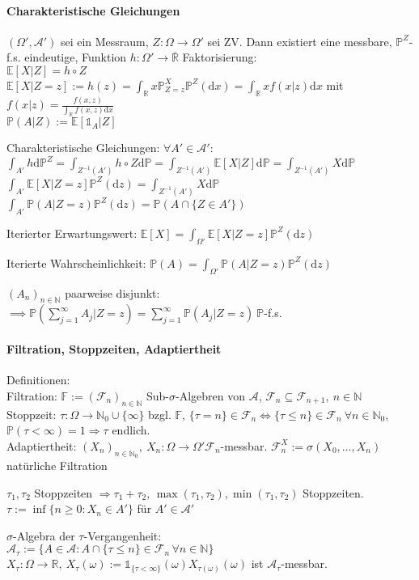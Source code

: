 \documentclass[a4paper,draft]{article}
\newcommand{\R}{\mathds{R}}
\newcommand{\N}{\mathds{N}}
\newcommand{\one}{\mathds{1}}
\newcommand{\A}{\mathcal{A}}
\renewcommand{\P}{\mathds{P}}
\newcommand{\E}[1]{\mathds{E}[#1]}
\newcommand{\F}{\mathcal{F}}
\newcommand{\cE}[2]{\E{#1 | #2}}
\renewcommand{\d}{\mathrm{d}}
\newcommand{\parh}{\par\hangindent=0.5cm}
\begin{document}
\begin{multicols}{2}
\paragraph{Charakteristische Gleichungen}\hspace{0pt}\parh
$(\Omega',\A')$ sei ein Messraum, $Z:\Omega\to\Omega'$ sei ZV. Dann existiert eine messbare, $\P^Z$-f.s. eindeutige, Funktion $h:\Omega'\to\overline{\R}$ Faktorisierung:\\
$\cE{X}{Z}=h\circ Z$\\
$\cE{X}{Z=z}:=h(z)=\int_\R x\P_{Z=z}^X \P^Z(\d x)=\int_\R xf(x|z)\d x$ mit $f(x|z)=\frac{f(x,z)}{\int_\R f(x,z)\d x}$\\
$\P(A|Z):=\cE{\one_A}{Z}$\parh
Charakteristische Gleichungen: $\forall A'\in\A'$:\\
$\int_{A'}h\d \P^Z=\int_{Z^{-1}(A')}h\circ Z \d\P=\int_{Z^{-1}(A')}\cE{X}{Z}\d\P=\int_{Z^{-1}(A')}X\d\P$\\
$\int_{A'}\cE{X}{Z=z}\P^Z(\d z)=\int_{Z^{-1}(A')}X\d\P$\\
$\int_{A'} \P(A|Z=z)\P^Z(\d z) =\P(A\cap\{Z\in A'\})$\parh
Iterierter Erwartungswert: $\E{X}=\int_{\Omega'}\cE{X}{Z=z}\P^Z(\d z)$\parh
Iterierte Wahrscheinlichkeit: $\P(A)=\int_{\Omega'}\P(A|Z=z)\P^Z(\d z)$\parh
$(A_n)_{n\in\N}$ paarweise disjunkt:\\
$\implies \P\left(\sum_{j=1}^\infty A_j\big|Z=z\right)=\sum_{j=1}^\infty \P(A_j|Z=z) \: \P$-f.s.

\paragraph{Filtration, Stoppzeiten, Adaptiertheit}\hspace{0pt}\parh
Definitionen:\\
Filtration: $\mathds{F}:=(\F_n)_{n\in\N}$ Sub-$\sigma$-Algebren von $\A$, $\F_n\subseteq\F_{n+1},\:n\in\N$\\
Stoppzeit: $\tau:\Omega \to \N_0 \cup \{\infty\}$ bzgl. $\mathds{F}$, $\{\tau=n\}\in\F_n \Leftrightarrow\{\tau\leq n\}\in\F_n\:\forall n\in\N_0$, $\P(\tau<\infty)=1 \Rightarrow \tau$ endlich.\\
Adaptiertheit: $(X_n)_{n\in\N_0},\:X_n:\Omega\to\Omega' \F_n$-messbar. $\F_n^X:=\sigma(X_0,\dots,X_n)$ natürliche Filtration\parh
$\tau_1, \tau_2$ Stoppzeiten $\Longrightarrow \tau_1+\tau_2,\,\max(\tau_1,\tau_2),\min(\tau_1,\tau_2)$ Stoppzeiten. $\tau := \inf \{n\geq0:X_n\in A'\}$ für $A'\in\A'$\parh
$\sigma$-Algebra der $\tau$-Vergangenheit:\\
$\A_\tau:=\{A\in\A:A\cap\{\tau\leq n\}\in\F_n\,\forall n\in\N\}$\\
$X_\tau :\Omega\to\R,\:X_\tau(\omega):=\one_{\{\tau<\infty\}}(\omega)X_{\tau(\omega)}(\omega)$ ist $\A_\tau$-messbar.


\end{multicols}
\end{document}
